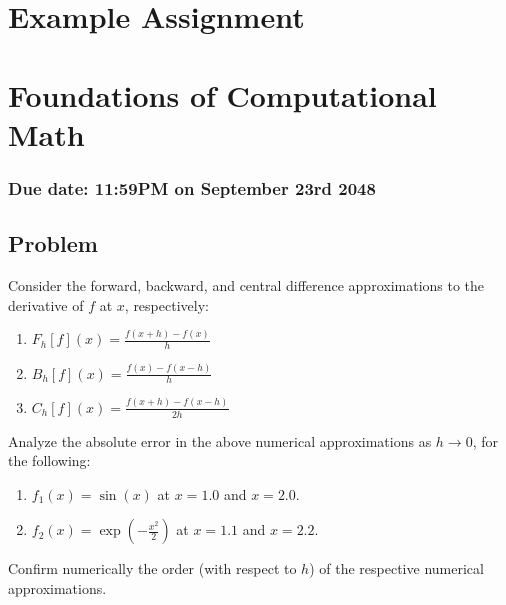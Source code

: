 \documentclass[12pt]{article}
\begin{document}
\section*{Example Assignment} 
\section*{Foundations of Computational Math}
\subsubsection*{Due date: 11:59PM on September 23rd 2048}

\vspace{0.5in}

\subsection*{Problem}

Consider the forward, backward, and central difference approximations to the derivative of $f$ at $x$, respectively:

\begin{enumerate}
    \item $\displaystyle F_h[f](x) = \frac{f(x+h) - f(x)}{h}$
    \item $\displaystyle B_h[f](x) = \frac{f(x) - f(x-h)}{h}$
    \item $\displaystyle C_h[f](x) = \frac{f(x+h) - f(x-h)}{2h}$
\end{enumerate}

\noindent Analyze the absolute error in the above numerical approximations as $h \to 0$, for the following:
\begin{enumerate}
    \item $f_1(x) = \sin(x)$ at $x=1.0$ and $x=2.0$.
    \item $f_2(x) = \exp\left(-\frac{x^2}{2}\right)$ at $x=1.1$ and $x=2.2$.
\end{enumerate}
Confirm numerically the order (with respect to $h$) of the respective numerical approximations.

\vspace{0.1in}

% 
% 
% 
% 
% 


\end{document}
